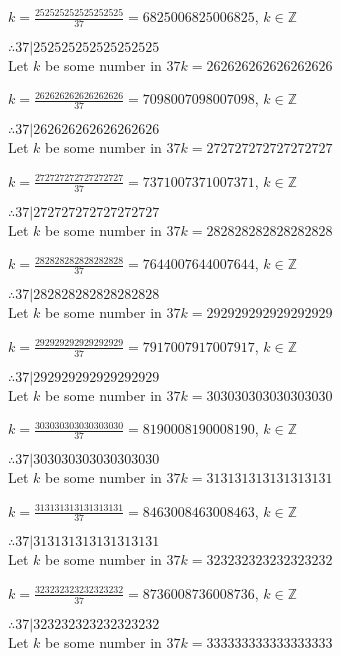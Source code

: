\documentclass{article}
\begin{document}
$k = \frac{252525252525252525}{37} = 6825006825006825$, $k \in \mathbb{Z}$

$ \therefore  37|252525252525252525 $ \\

Let $k$ be some number in $37k = 262626262626262626$

$k = \frac{262626262626262626}{37} = 7098007098007098$, $k \in \mathbb{Z}$

$ \therefore  37|262626262626262626 $ \\

Let $k$ be some number in $37k = 272727272727272727$

$k = \frac{272727272727272727}{37} = 7371007371007371$, $k \in \mathbb{Z}$

$ \therefore  37|272727272727272727 $ \\

Let $k$ be some number in $37k = 282828282828282828$

$k = \frac{282828282828282828}{37} = 7644007644007644$, $k \in \mathbb{Z}$

$ \therefore  37|282828282828282828 $ \\

Let $k$ be some number in $37k = 292929292929292929$

$k = \frac{292929292929292929}{37} = 7917007917007917$, $k \in \mathbb{Z}$

$ \therefore  37|292929292929292929 $ \\

Let $k$ be some number in $37k = 303030303030303030$

$k = \frac{303030303030303030}{37} = 8190008190008190$, $k \in \mathbb{Z}$

$ \therefore  37|303030303030303030 $ \\

Let $k$ be some number in $37k = 313131313131313131$

$k = \frac{313131313131313131}{37} = 8463008463008463$, $k \in \mathbb{Z}$

$ \therefore  37|313131313131313131 $ \\

Let $k$ be some number in $37k = 323232323232323232$

$k = \frac{323232323232323232}{37} = 8736008736008736$, $k \in \mathbb{Z}$

$ \therefore  37|323232323232323232 $ \\

Let $k$ be some number in $37k = 333333333333333333$
\end{document}
